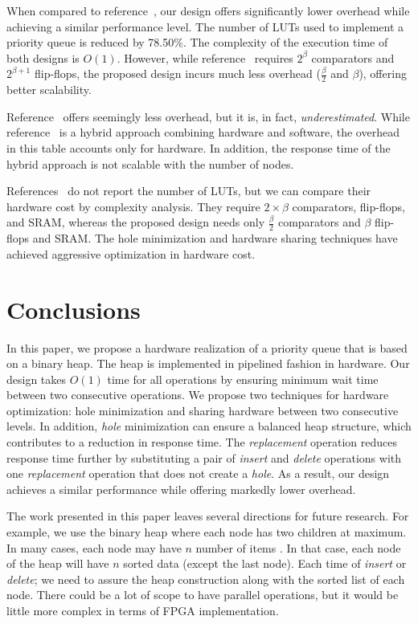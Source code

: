 \documentclass[10pt, conference, compsocconf]{IEEEtran}
\begin{document}
When compared to reference~\cite{hw8}, our design offers significantly lower overhead while achieving a similar performance level.
The number of LUTs used to implement a priority queue is reduced by 78.50\%.
The complexity of the execution time of both designs is $O(1)$.
However, while reference~\cite{hw8} requires $2^\beta$ comparators and $2^{\beta+1}$ flip-flops, the proposed design incurs much less overhead ($\frac{\beta}{2}$ and $\beta$), offering better scalability.

Reference~\cite{hw11} offers seemingly less overhead, but it is, in fact, {\it underestimated}.
While reference~\cite{hw11} is a hybrid approach combining hardware and software, the overhead in this table accounts only for hardware.
In addition, the response time of the hybrid approach is not scalable with the number of nodes.

References~\cite{fpga1,hw2} do not report the number of LUTs, but we can compare their hardware cost by complexity analysis.
They require $2 \times \beta$ comparators, flip-flops, and SRAM, whereas the proposed design needs only $\frac{\beta}{2}$ comparators and $\beta$ flip-flops and SRAM.
The hole minimization and hardware sharing techniques have achieved aggressive optimization in hardware cost.



\section{Conclusions}

In this paper, we propose a hardware realization of a priority queue that is based on a binary heap.
The heap is implemented in pipelined fashion in hardware.
Our design takes $O(1)$ time for all operations by ensuring minimum wait time between two consecutive operations.
We propose two techniques for hardware optimization: hole minimization and sharing hardware between two consecutive levels.
In addition, {\it hole} minimization can ensure a balanced heap structure, which contributes to a reduction in response time.
The {\it replacement} operation reduces response time further by substituting a pair of {\it insert} and {\it delete} operations with one {\it replacement } operation that does not create a {\it hole}.
As a result, our design achieves a similar performance while offering markedly lower overhead.

The work presented in this paper leaves several directions for future research. For example, we use the binary heap where each node has two children at maximum. In many cases, each node may have $n$ number of items \cite{pq3}. In that case, each node of the heap will have $n$ sorted data (except the last node). Each time of {\it insert} or {\it delete}; we need to assure the heap construction along with the sorted list of each node. There could be a lot of scope to have parallel operations, but it would be little more complex in terms of FPGA implementation.
\end{document}
